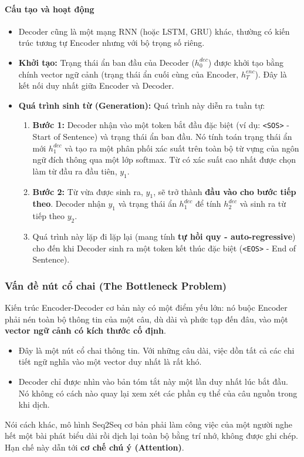 \paragraph{Cấu tạo và hoạt động}
\begin{itemize}
    \item Decoder cũng là một mạng RNN (hoặc LSTM, GRU) khác, thường có kiến trúc tương tự Encoder nhưng với bộ trọng số riêng.
    \item \textbf{Khởi tạo:} Trạng thái ẩn ban đầu của Decoder ($h_0^{dec}$) được khởi tạo bằng chính vector ngữ cảnh (trạng thái ẩn cuối cùng của Encoder, $h_T^{enc}$). Đây là kết nối duy nhất giữa Encoder và Decoder.
    \item \textbf{Quá trình sinh từ (Generation):} Quá trình này diễn ra tuần tự:
        \begin{enumerate}
            \item \textbf{Bước 1:} Decoder nhận vào một token bắt đầu đặc biệt (ví dụ: \texttt{<SOS>} - Start of Sentence) và trạng thái ẩn ban đầu. Nó tính toán trạng thái ẩn mới $h_1^{dec}$ và tạo ra một phân phối xác suất trên toàn bộ từ vựng của ngôn ngữ đích thông qua một lớp softmax. Từ có xác suất cao nhất được chọn làm từ đầu ra đầu tiên, $y_1$.
            \item \textbf{Bước 2:} Từ vừa được sinh ra, $y_1$, sẽ trở thành \textbf{đầu vào cho bước tiếp theo}. Decoder nhận $y_1$ và trạng thái ẩn $h_1^{dec}$ để tính $h_2^{dec}$ và sinh ra từ tiếp theo $y_2$.
            \item Quá trình này lặp đi lặp lại (mang tính \textbf{tự hồi quy - auto-regressive}) cho đến khi Decoder sinh ra một token kết thúc đặc biệt (\texttt{<EOS>} - End of Sentence).
        \end{enumerate}
\end{itemize}

\subsubsection{Vấn đề nút cổ chai (The Bottleneck Problem)}
Kiến trúc Encoder-Decoder cơ bản này có một điểm yếu lớn: nó buộc Encoder phải nén toàn bộ thông tin của một câu, dù dài và phức tạp đến đâu, vào một \textbf{vector ngữ cảnh có kích thước cố định}.
\begin{itemize}
    \item Đây là một nút cổ chai thông tin. Với những câu dài, việc dồn tất cả các chi tiết ngữ nghĩa vào một vector duy nhất là rất khó.
    \item Decoder chỉ được nhìn vào bản tóm tắt này một lần duy nhất lúc bắt đầu. Nó không có cách nào quay lại xem xét các phần cụ thể của câu nguồn trong khi dịch.
\end{itemize}
Nói cách khác, mô hình Seq2Seq cơ bản phải làm công việc của một người nghe hết một bài phát biểu dài rồi dịch lại toàn bộ bằng trí nhớ, không được ghi chép. Hạn chế này dẫn tới \textbf{cơ chế chú ý (Attention)}.

